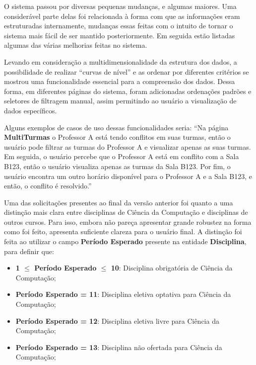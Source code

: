 O sistema passou por diversas pequenas mudanças, e algumas maiores. Uma considerável parte delas foi relacionada à forma com que as informações eram estruturadas internamente, mudanças essas feitas com o intuito de tornar o sistema mais fácil de ser mantido posteriormente. Em seguida estão listadas algumas das várias melhorias feitas no sistema.

 \label{ssssec:Filtros e ordenações}

Levando em consideração a multidimensionalidade da estrutura dos dados, a possibilidade de realizar ``curvas de nível'' e as ordenar por diferentes critérios se mostrou uma funcionalidade essencial para a compreensão dos dados. Dessa forma, em diferentes páginas do sistema, foram adicionadas ordenações padrões e seletores de filtragem manual, assim permitindo ao usuário a visualização de dados específicos.

Alguns exemplos de casos de uso dessas funcionalidades seria: ``Na página \textbf{MultiTurmas} o Professor A está tendo conflitos em suas turmas, então o usuário pode filtrar as turmas do Professor A e visualizar apenas as suas turmas. Em seguida, o usuário percebe que o Professor A está em conflito com a Sala B123, então o usuário visualiza apenas as turmas da Sala B123. Por fim, o usuário encontra um outro horário disponível para o Professor A e a Sala B123, e então, o conflito é resolvido.''

Uma das solicitações presentes ao final da versão anterior foi quanto a uma distinção mais clara entre disciplinas de Ciência da Computação e disciplinas de outros cursos. Para isso, embora não pareça apresentar grande robustez na forma como foi feito, apresenta suficiente clareza para o usuário final. A distinção foi feita ao utilizar o campo \textbf{Período Esperado} presente na entidade \textbf{Disciplina}, para definir que:

\begin{itemize}
  \item \textbf{1 $\leq$ Período Esperado $\leq$ 10}: Disciplina obrigatória de Ciência da Computação;
  \item \textbf{Período Esperado = 11}: Disciplina eletiva optativa para Ciência da Computação;
  \item \textbf{Período Esperado = 12}: Disciplina eletiva livre para Ciência da Computação;
  \item \textbf{Período Esperado = 13}: Disciplina não ofertada para Ciência da Computação;
\end{itemize}

